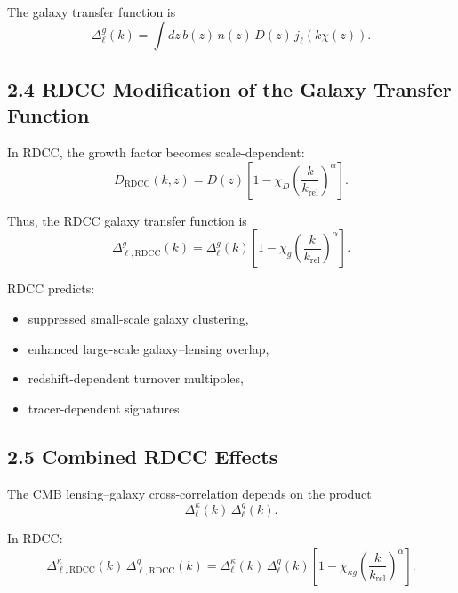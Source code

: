\documentclass[11pt,a4paper]{article}
\begin{document}
The galaxy transfer function is
\begin{equation}
    \Delta_{\ell}^{g}(k)
    = \int dz\,
      b(z)\,n(z)\,D(z)\,
      j_{\ell}(k\chi(z)).
\end{equation}

\subsection*{2.4 RDCC Modification of the Galaxy Transfer Function}

In RDCC, the growth factor becomes scale-dependent:
\begin{equation}
    D_{\mathrm{RDCC}}(k,z)
    = D(z)
      \left[
        1 - \chi_{D}
        \left(\frac{k}{k_{\mathrm{rel}}}\right)^{\alpha}
      \right].
\end{equation}

Thus, the RDCC galaxy transfer function is
\begin{equation}
    \Delta_{\ell,\mathrm{RDCC}}^{g}(k)
    = \Delta_{\ell}^{g}(k)
      \left[
        1 - \chi_{g}
        \left(\frac{k}{k_{\mathrm{rel}}}\right)^{\alpha}
      \right].
\end{equation}

RDCC predicts:

\begin{itemize}
    \item suppressed small-scale galaxy clustering,
    \item enhanced large-scale galaxy–lensing overlap,
    \item redshift-dependent turnover multipoles,
    \item tracer-dependent signatures.
\end{itemize}

\subsection*{2.5 Combined RDCC Effects}

The CMB lensing–galaxy cross-correlation depends on the product
\begin{equation}
    \Delta_{\ell}^{\kappa}(k)\,
    \Delta_{\ell}^{g}(k).
\end{equation}

In RDCC:
\begin{equation}
    \Delta_{\ell,\mathrm{RDCC}}^{\kappa}(k)\,
    \Delta_{\ell,\mathrm{RDCC}}^{g}(k)
    =
    \Delta_{\ell}^{\kappa}(k)\,
    \Delta_{\ell}^{g}(k)
    \left[
        1 - \chi_{\kappa g}
        \left(\frac{k}{k_{\mathrm{rel}}}\right)^{\alpha}
    \right].
\end{equation}
\end{document}
